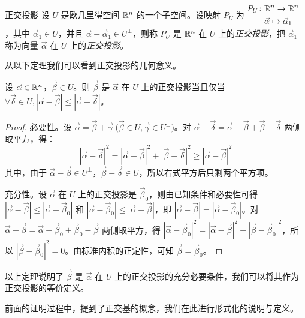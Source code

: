 \begin{definition}{正交投影}
	设 $U$ 是欧几里得空间 $\mathbb R^n$ 的一个子空间。设映射 $P_U$ 为 $\begin{aligned}P_U \colon & \mathbb R^n \to \mathbb R^n \\& \vec \alpha \mapsto \vec \alpha_1 \end{aligned}$，其中 $\vec \alpha_1 \in U$，并且 $\vec \alpha - \vec \alpha_1 \in U^\perp$，则称 $P_U$ 是 $\mathbb R^n$ 在 $U$ 上的\emph{正交投影}，把 $\vec \alpha_1$ 称为向量 $\vec \alpha$ 在 $U$ 上的\emph{正交投影}。
\end{definition}

从以下定理我们可以看到正交投影的几何意义。

\begin{theorem}
	设 $\vec \alpha \in \mathbb R^n$，$\vec \beta \in U$。则 $\vec \beta$ 是 $\vec \alpha$ 在 $U$ 上的正交投影当且仅当 $\forall \vec \delta \in U, |\vec \alpha - \vec \beta| \le |\vec \alpha - \vec \delta|$。
\end{theorem}

\begin{proof}
	必要性。设 $\vec \alpha = \vec \beta + \vec \gamma \pod{\vec \beta \in U, \vec \gamma \in U^\perp}$。对 $\vec \alpha - \vec \delta = \vec \alpha - \vec \beta + \vec \beta - \vec \delta$ 两侧取平方，得：
	$$
	|\vec \alpha - \vec \delta|^2 = |\vec \alpha - \vec \beta|^2 + |\vec \beta - \vec \delta|^2 \ge |\vec \alpha - \vec \beta|^2
	$$
	其中，由于 $\vec \alpha - \vec \beta\in U^\perp$，$\vec \beta - \vec \delta \in U$，所以右式平方后只剩两个平方项。

	充分性。设 $\vec \alpha$ 在 $U$ 上的正交投影是 $\vec \beta_0$，则由已知条件和必要性可得 $|\vec \alpha - \vec \beta| \le |\vec \alpha - \vec \beta_0|$ 和 $|\vec \alpha - \vec \beta_0| \le |\vec \alpha - \vec \beta|$，即 $|\vec \alpha - \vec \beta| = |\vec \alpha - \vec \beta_0|$。对 $\vec \alpha - \vec \beta = \vec \alpha - \vec \beta_0 + \vec \beta_0 - \vec \beta$ 两侧取平方，得 $|\vec \alpha - \vec \beta_0|^2 = |\vec \alpha - \vec \beta|^2 + |\vec \beta - \vec \beta_0|^2$，所以 $|\vec \beta - \vec \beta_0|^2 = 0$。由标准内积的正定性，可知 $\vec \beta = \vec \beta_0$。
\end{proof}

以上定理说明了 $\vec \beta$ 是 $\vec \alpha$ 在 $U$ 上的正交投影的充分必要条件，我们可以将其作为正交投影的等价定义。

\bigskip

前面的证明过程中，提到了正交基的概念，我们在此进行形式化的说明与定义。

